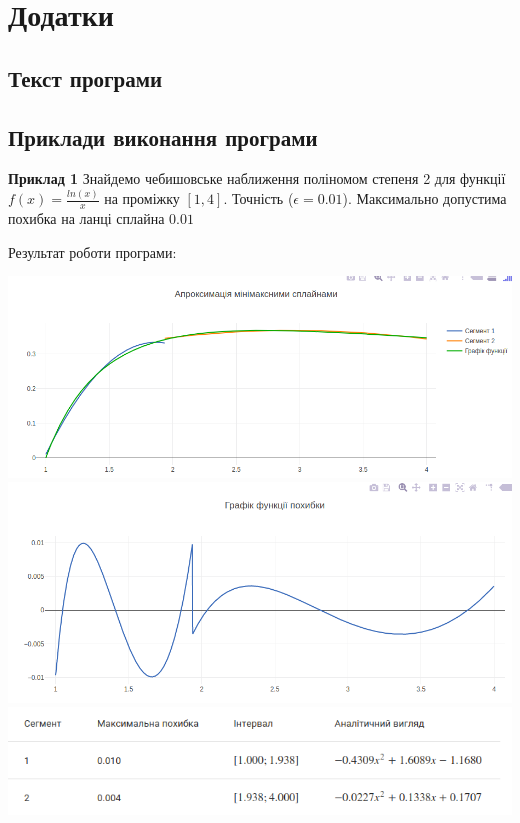 \documentclass[ukrainian,14pt]{extarticle}
\begin{document}
\newpage

\section{Додатки}
\subsection{Текст програми}


\newpage

\subsection{Приклади виконання програми}
\textbf{Приклад 1} 
Знайдемо чебишовське наближення поліномом степеня 2 для функції $f(x) = \frac{ln(x)}{x}$ на проміжку $[1, 4]$. Точність ($\epsilon = 0.01$). Максимально допустима похибка на ланці сплайна $0.01$

Результат роботи програми:

\includegraphics[scale=0.5]{example1}
\includegraphics[scale=0.5]{example1_error} \\
\includegraphics[scale=0.5]{example1_table}
\end{document}
